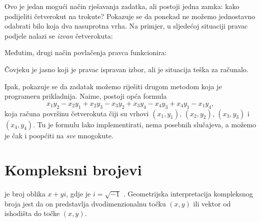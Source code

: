 Ovo je jedan mogući način rješavanja zadatka,
ali postoji jedna zamka:
kako podijeliti četverokut na trokute?
Pokazuje se da ponekad ne možemo jednostavno odabrati
bilo koja dva nasuprotna vrha.
Na primjer, u sljedećoj situaciji
pravac podjele nalazi se \emph{izvan} četverokuta:
\begin{center}
\end{center}
Međutim, drugi način povlačenja pravca funkcionira:
\begin{center}
\end{center}
Čovjeku je jasno koji je pravac ispravan
izbor, ali je situacija teška za računalo.
                           
Ipak, pokazuje se da zadatak možemo riješiti
drugom metodom koja je programeru prikladnija.
Naime, postoji opća formula
\[x_1y_2-x_2y_1+x_2y_3-x_3y_2+x_3y_4-x_4y_3+x_4y_1-x_1y_4,\]
koja računa površinu četverokuta
čiji su vrhovi
$(x_1,y_1)$,
$(x_2,y_2)$,
$(x_3,y_3)$ i
$(x_4,y_4)$.
Tu je formulu lako implementirati, nema posebnih
slučajeva, a možemo je čak i poopćiti
na \emph{sve} mnogokute.

\section{Kompleksni brojevi}


 je broj oblika $x+y i$,
gdje je $i = \sqrt{-1}$ .
Geometrijska interpretacija kompleksnog broja jest
da on predstavlja dvodimenzionalnu točku $(x,y)$
ili vektor od ishodišta do točke $(x,y)$.


